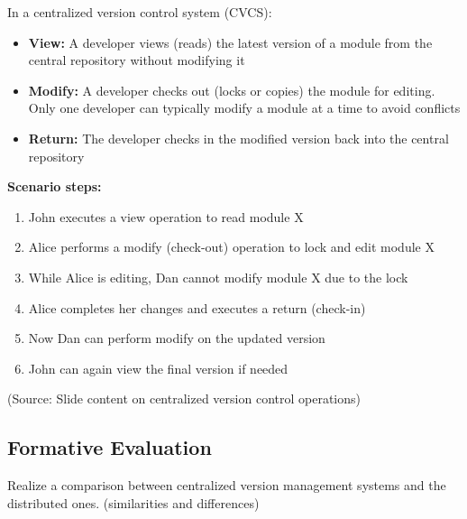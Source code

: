 \documentclass[12pt]{article}
\begin{document}
In a centralized version control system (CVCS):
\begin{itemize}
    \item \textbf{View:} A developer views (reads) the latest version of a module from the central repository without modifying it
    \item \textbf{Modify:} A developer checks out (locks or copies) the module for editing. Only one developer can typically modify a module at a time to avoid conflicts
    \item \textbf{Return:} The developer checks in the modified version back into the central repository
\end{itemize}

\textbf{Scenario steps:}
\begin{enumerate}
    \item John executes a view operation to read module X
    \item Alice performs a modify (check-out) operation to lock and edit module X
    \item While Alice is editing, Dan cannot modify module X due to the lock
    \item Alice completes her changes and executes a return (check-in)
    \item Now Dan can perform modify on the updated version
    \item John can again view the final version if needed
\end{enumerate}

(Source: Slide content on centralized version control operations)

\subsection{Formative Evaluation}

\begin{questionbox}
Realize a comparison between centralized version management systems and the distributed ones. (similarities and differences)
\end{questionbox}
\end{document}
